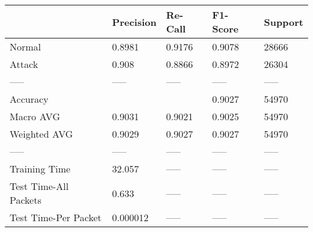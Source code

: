 \begin{tabular}{lllll}
\toprule
{} & Precision & Re-Call & F1-Score & Support \\
\midrule
Normal                &    0.8981 &  0.9176 &   0.9078 &   28666 \\
Attack                &     0.908 &  0.8866 &   0.8972 &   26304 \\
-----                 &     ----- &   ----- &    ----- &   ----- \\
Accuracy              &           &         &   0.9027 &   54970 \\
Macro AVG             &    0.9031 &  0.9021 &   0.9025 &   54970 \\
Weighted AVG          &    0.9029 &  0.9027 &   0.9027 &   54970 \\
-----                 &     ----- &   ----- &    ----- &   ----- \\
Training Time         &    32.057 &   ----- &    ----- &   ----- \\
Test Time-All Packets &     0.633 &   ----- &    ----- &   ----- \\
Test Time-Per Packet  &  0.000012 &   ----- &    ----- &   ----- \\
\bottomrule
\end{tabular}
